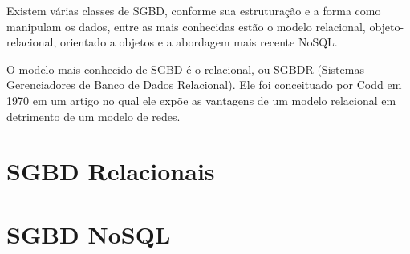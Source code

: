 Existem várias classes de SGBD, conforme sua estruturação e a forma como manipulam os dados, 
entre as mais conhecidas estão o modelo relacional, objeto-relacional, orientado a 
objetos e a abordagem mais recente NoSQL.

O modelo mais conhecido de SGBD é o relacional, ou SGBDR (Sistemas Gerenciadores 
de Banco de Dados Relacional). Ele foi conceituado por 
Codd \cite{codd1970relational} em 1970 em um artigo no qual ele expõe as 
vantagens de um modelo relacional em detrimento de um modelo de redes. 



\section{SGBD Relacionais}



\section{SGBD NoSQL}
